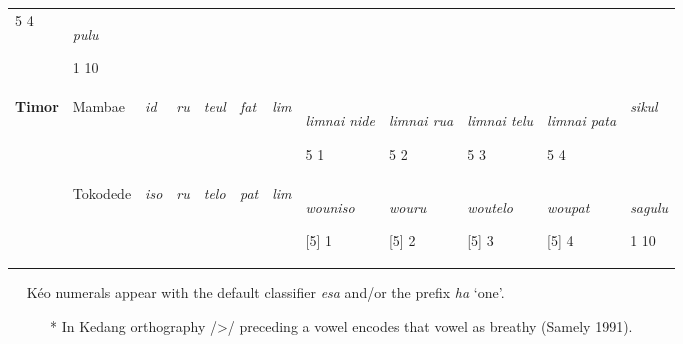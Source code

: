 \begin{flushleft}
\begin{supertabular}{|m{0.7066598in}m{0.6809598in}m{0.49275985in}m{0.60315984in}m{0.64835984in}m{0.6802598in}m{0.63935983in}m{0.99275976in}m{1.0316598in}m{0.9462598in}m{0.9511598in}m{0.60315984in}|}
5 4 &
{\itshape pulu}

1 10\\
\bfseries Timor &
Mambae &
\itshape id &
\itshape ru &
\itshape teul &
\itshape fat &
\itshape lim &
{\itshape limnai nide}

5 1 &
{\itshape limnai rua}

5 2 &
{\itshape limnai telu}

5 3 &
{\itshape limnai pata}

5 4 &
\itshape sikul\\
 &
Tokodede  &
\itshape iso &
\itshape ru &
\itshape telo &
\itshape pat &
\itshape lim &
{\itshape wouniso}

[5] 1 &
{\itshape wouru}

[5] 2  &
{\itshape woutelo}

[5] 3 &
{\itshape woupat}

[5] 4 &
{\itshape sagulu}

1 10\\\hline
\end{supertabular}
\end{flushleft}
\ \ {\dag} K\'eo numerals appear with the default classifier \textit{{\textglotstop}esa} and/or the prefix \textit{ha} {\textquoteleft}one{\textquoteright}.

\ \ \ \ \ \ * In Kedang orthography /{\textgreater}/ preceding a vowel encodes that vowel as breathy (Samely 1991).

\clearpage\clearpage\setcounter{page}{1}\pagestyle{Convertedxxi}

